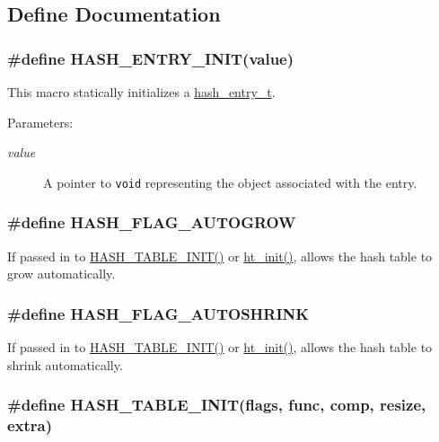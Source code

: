 \subsection{Define Documentation}
\hypertarget{group__dbprim__hash_a29}{
\subsubsection[HASH\_\-ENTRY\_\-INIT]{\setlength{\rightskip}{0pt plus 5cm}\#define HASH\_\-ENTRY\_\-INIT(value)}}
\label{group__dbprim__hash_a29}


This macro statically initializes a \hyperlink{group__dbprim__hash_a1}{hash\_\-entry\_\-t}.\begin{Desc}
\item[Parameters: ]\par
\begin{description}
\item[{\em 
value}]A pointer to {\tt void} representing the object associated with the entry. \end{description}
\end{Desc}
\hypertarget{group__dbprim__hash_a16}{
\subsubsection[HASH\_\-FLAG\_\-AUTOGROW]{\setlength{\rightskip}{0pt plus 5cm}\#define HASH\_\-FLAG\_\-AUTOGROW}}
\label{group__dbprim__hash_a16}


If passed in to \hyperlink{group__dbprim__hash_a18}{HASH\_\-TABLE\_\-INIT()} or \hyperlink{group__dbprim__hash_a6}{ht\_\-init()}, allows the hash table to grow automatically. \hypertarget{group__dbprim__hash_a17}{
\subsubsection[HASH\_\-FLAG\_\-AUTOSHRINK]{\setlength{\rightskip}{0pt plus 5cm}\#define HASH\_\-FLAG\_\-AUTOSHRINK}}
\label{group__dbprim__hash_a17}


If passed in to \hyperlink{group__dbprim__hash_a18}{HASH\_\-TABLE\_\-INIT()} or \hyperlink{group__dbprim__hash_a6}{ht\_\-init()}, allows the hash table to shrink automatically. \hypertarget{group__dbprim__hash_a18}{
\subsubsection[HASH\_\-TABLE\_\-INIT]{\setlength{\rightskip}{0pt plus 5cm}\#define HASH\_\-TABLE\_\-INIT(flags, func, comp, resize, extra)}}
\label{group__dbprim__hash_a18}


